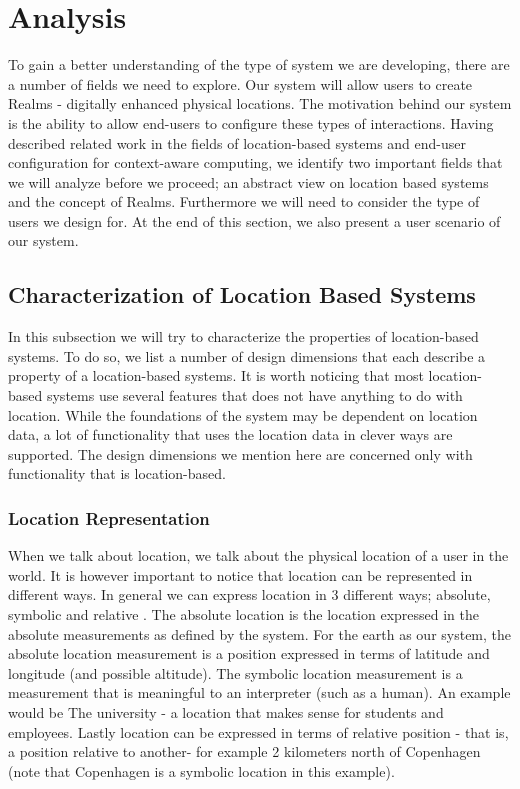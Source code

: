 \section{Analysis} %
\label{sec:analysis}
To gain a better understanding of the type of system we are developing, there are a number of fields we need to explore. Our system will allow users to create Realms - digitally enhanced physical locations. The motivation behind our system is the ability to allow end-users to configure these types of interactions. Having described related work in the fields of location-based systems and end-user configuration for context-aware computing, we identify two important fields that we will analyze before we proceed; an abstract view on location based systems and the concept of Realms. Furthermore we will need to consider the type of users we design for. At the end of this section, we also present a user scenario of our system.

\subsection{Characterization of Location Based Systems} %
\label{sub:taxanomy_of_location_features}
In this subsection we will try to characterize the properties of location-based systems. To do so, we list a number of design dimensions that each describe a property of a location-based systems. It is worth noticing that most location-based systems use several features that does not have anything to do with location. While the foundations of the system may be dependent on location data, a lot of functionality that uses the location data in clever ways are supported. The design dimensions we mention here are concerned only with functionality that is location-based. 

\subsubsection{Location Representation}
When we talk about location, we talk about the physical location of a user in the world. It is however important to notice that location can be represented in different ways. In general we can express location in 3 different ways; absolute, symbolic and relative \cite{ubicomp_book:bardram}. The absolute location is the location expressed in the absolute measurements as defined by the system. For the earth as our system, the absolute location measurement is a position expressed in terms of latitude and longitude (and possible altitude). The symbolic location measurement is a measurement that is meaningful to an interpreter (such as a human). An example would be The university - a location that makes sense for students and employees. Lastly location can be expressed in terms of relative position - that is, a position relative to another- for example 2 kilometers north of Copenhagen (note that Copenhagen is a symbolic location in this example).

